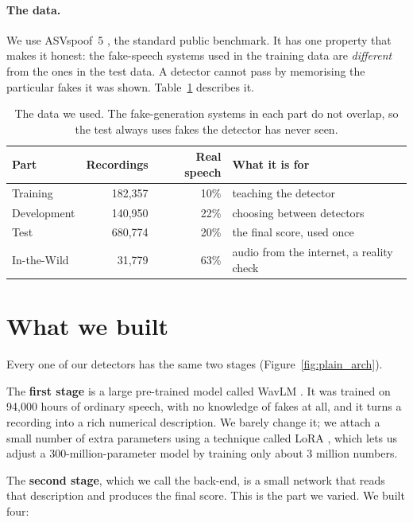 \documentclass[11pt,a4paper]{article}
\begin{document}
\paragraph{The data.} We use ASVspoof~5 \citep{asvspoof5}, the standard public benchmark. It has one
property that makes it honest: the fake-speech systems used in the training data are \emph{different}
from the ones in the test data. A detector cannot pass by memorising the particular fakes it was
shown. Table~\ref{tab:plain_data} describes it.

\begin{table}[t]
\centering
\small
\caption{The data we used. The fake-generation systems in each part do not overlap, so the test
always uses fakes the detector has never seen.}
\label{tab:plain_data}
\begin{tabular}{lrrl}
\toprule
Part & Recordings & Real speech & What it is for \\
\midrule
Training & 182{,}357 & 10\% & teaching the detector \\
Development & 140{,}950 & 22\% & choosing between detectors \\
Test & 680{,}774 & 20\% & the final score, used once \\
In-the-Wild & 31{,}779 & 63\% & audio from the internet, a reality check \\
\bottomrule
\end{tabular}
\end{table}

\section{What we built}

Every one of our detectors has the same two stages (Figure~\ref{fig:plain_arch}).

The \textbf{first stage} is a large pre-trained model called WavLM \citep{wavlm}. It was trained on
94{,}000 hours of ordinary speech, with no knowledge of fakes at all, and it turns a recording into a
rich numerical description. We barely change it; we attach a small number of extra parameters using a
technique called LoRA \citep{lora}, which lets us adjust a 300-million-parameter model by training
only about 3 million numbers.

The \textbf{second stage}, which we call the back-end, is a small network that reads that description
and produces the final score. This is the part we varied. We built four:
\end{document}
